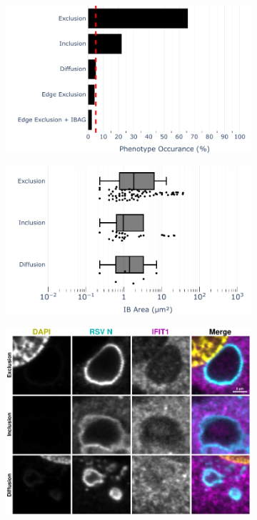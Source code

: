 \begin{figure}
    \begin{subfigure}{0.495\textwidth}
        \caption{}
        \includegraphics[width=1\linewidth]{09. Chapter 4/Figs/02. Infection/01. IFIT1/07. bar_i1_mdbk.pdf} 
    \end{subfigure}
    \begin{subfigure}{0.495\textwidth}
        \caption{}
        \includegraphics[width=1\linewidth]{09. Chapter 4/Figs/02. Infection/01. IFIT1/08. box_i1_mdbk.pdf}
    \end{subfigure}
    \begin{subfigure}{1\textwidth}
        \centering
        \caption{}
        \includegraphics[width=1\linewidth]{09. Chapter 4/Figs/02. Infection/01. IFIT1/09. mdbk i1.pdf}

\end{subfigure}
\end{figure}
